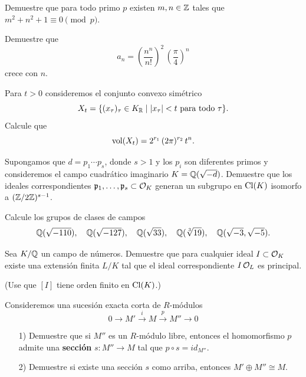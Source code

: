 \begin{ejercicio}
  Demuestre que para todo primo $p$ existen $m,n \in \mathbb{Z}$ tales que
  $m^2 + n^2 + 1 \equiv 0 \pmod{p}$.
\end{ejercicio}

\begin{ejercicio}
  Demuestre que
  $$a_n = \left(\frac{n^n}{n!}\right)^2\,\left(\frac{\pi}{4}\right)^n$$
  crece con $n$.
\end{ejercicio}

\begin{ejercicio}
  Para $t > 0$ consideremos el conjunto convexo simétrico
  $$X_t = \{ (x_\tau)_\tau \in K_{\mathbb{R}} \mid |x_\tau| < t\text{ para todo }\tau \}.$$
  Calcule que
  $$\operatorname{vol} (X_t) = 2^{r_1}\,(2\pi)^{r_2}\,t^n.$$
\end{ejercicio}

\begin{ejercicio}
  Supongamos que $d = p_1\cdots p_s$, donde $s > 1$ y los $p_i$ son diferentes
  primos y consideremos el campo cuadrático imaginario $K = \mathbb{Q} (\sqrt{-d})$.
  Demuestre que los ideales correspondientes
  $\mathfrak{p}_1,\ldots,\mathfrak{p}_s \subset \mathcal{O}_K$ generan un subgrupo en
  $\operatorname{Cl} (K)$ isomorfo a $(\mathbb{Z}/2\mathbb{Z})^{s-1}$.
\end{ejercicio}

\begin{ejercicio}
  Calcule los grupos de clases de campos
  \[ \mathbb{Q} (\sqrt{-110}), \quad
     \mathbb{Q} (\sqrt{-127}), \quad
     \mathbb{Q} (\sqrt{33}), \quad
     \mathbb{Q} (\sqrt[3]{19}), \quad
     \mathbb{Q} (\sqrt{-3}, \sqrt{-5}). \]
\end{ejercicio}

\begin{ejercicio}
  Sea $K/\mathbb{Q}$ un campo de números. Demuestre que para cualquier ideal
  $I \subset \mathcal{O}_K$ existe una extensión finita $L/K$ tal que el ideal
  correspondiente $I\,\mathcal{O}_L$ es principal.

  \noindent (Use que $[I]$ tiene orden finito en $\operatorname{Cl} (K)$.)
\end{ejercicio}

\begin{ejercicio}
  \label{ejerc:seccion-de-sec}
  Consideremos una sucesión exacta corta de $R$-módulos
  $$0 \to M' \xrightarrow{i} M \xrightarrow{p} M'' \to 0$$

  \begin{enumerate}
  \item[1)] Demuestre que si $M''$ es un $R$-módulo libre, entonces
    el homomorfismo $p$ admite una \textbf{sección} $s\colon M'' \to M$
    tal que $p\circ s = id_{M''}$.

  \item[2)] Demuestre si existe una sección $s$ como arriba, entonces
    $M'\oplus M'' \cong M$.
  \end{enumerate}
\end{ejercicio}


